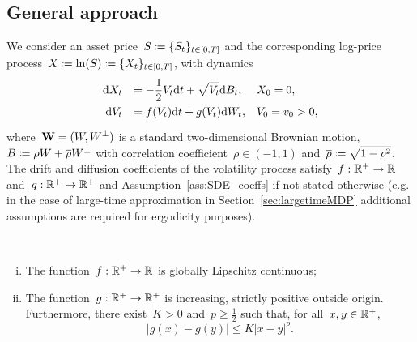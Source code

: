 \subsection{General approach}
We consider an asset price~$S\coloneqq \{S_t\}_{t\in[0,T]}$ and the corresponding log-price process~$X\coloneqq\ln(S) \coloneqq \{X_t\}_{t\in[0,T]}$, with dynamics
\begin{equation}\label{eq:log_price_dyn}
\begin{array}{rll}
\def\arraystretch{1.5}
\D X_t & = \displaystyle -\frac{1}{2}V_t \D t + \sqrt{V_t} \D B_t, & X_0 = 0, \\
\D V_t & = f(V_t)\D t + g(V_t)\D W_t, & V_0 = v_0>0,
\end{array}
\end{equation}
where~$\boldsymbol{\mathrm{W}} = (W,W^{\perp})$ is a standard two-dimensional Brownian motion, ${B\coloneqq \rho W + \overline{\rho}W^{\perp}}$ with correlation coefficient~$\rho \in (-1,1)$ and~$\overline{\rho}\coloneqq \sqrt{1-\rho^2}$. The drift and diffusion coefficients of the volatility process satisfy~${f:\mathbb{R}^+\rightarrow\mathbb{R}}$ and~${g:\mathbb{R}^+\rightarrow\mathbb{R}^+}$ and Assumption~\ref{ass:SDE_coeffs} if not stated otherwise (e.g. in the case of large-time approximation in Section~\ref{sec:largetimeMDP} additional assumptions are required for ergodicity purposes). 
\begin{assumption}\label{ass:SDE_coeffs}\
\begin{enumerate}[(i)]
\item The function~$f:\mathbb{R}^+\rightarrow\mathbb{R}$ is globally Lipschitz continuous;
\item The function~$g:\mathbb{R}^+\rightarrow \mathbb{R}^+$ is increasing, strictly positive outside origin.
Furthermore, there exist~$K>0$ and~$p\geq\frac12$ such that, for all~$x,y\in\mathbb{R}^+$,
\[
\left|g(x)-g(y)\right|\leq K |x-y|^p.
\]
\end{enumerate}
\end{assumption}
